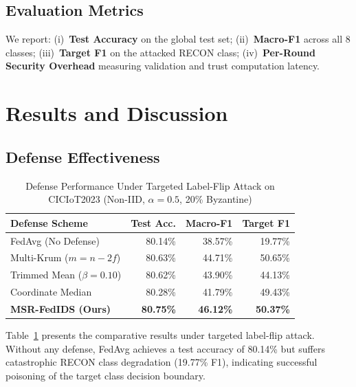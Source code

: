 \documentclass[conference]{IEEEtran}
\begin{document}
\subsection{Evaluation Metrics}
We report: (i)~\textbf{Test Accuracy} on the global test set; (ii)~\textbf{Macro-F1} across all 8 classes; (iii)~\textbf{Target F1} on the attacked RECON class; (iv)~\textbf{Per-Round Security Overhead} measuring validation and trust computation latency.

\section{Results and Discussion}
\label{sec:results}

\subsection{Defense Effectiveness}

\begin{table}[t]
\caption{Defense Performance Under Targeted Label-Flip Attack on CICIoT2023 (Non-IID, $\alpha = 0.5$, 20\% Byzantine)}
\label{tab:defense_results}
\centering
\begin{tabular}{@{}lrrr@{}}
\toprule
\textbf{Defense Scheme} & \textbf{Test Acc.} & \textbf{Macro-F1} & \textbf{Target F1} \\
\midrule
FedAvg (No Defense) & 80.14\% & 38.57\% & 19.77\% \\
Multi-Krum ($m{=}n{-}2f$) & 80.63\% & 44.71\% & 50.65\% \\
Trimmed Mean ($\beta{=}0.10$) & 80.62\% & 43.90\% & 44.13\% \\
Coordinate Median & 80.28\% & 41.79\% & 49.43\% \\
\midrule
\textbf{MSR-FedIDS (Ours)} & \textbf{80.75\%} & \textbf{46.12\%} & \textbf{50.37\%} \\
\bottomrule
\end{tabular}
\end{table}

Table~\ref{tab:defense_results} presents the comparative results under targeted label-flip attack. Without any defense, FedAvg achieves a test accuracy of 80.14\% but suffers catastrophic RECON class degradation (19.77\% F1), indicating successful poisoning of the target class decision boundary.
\end{document}
